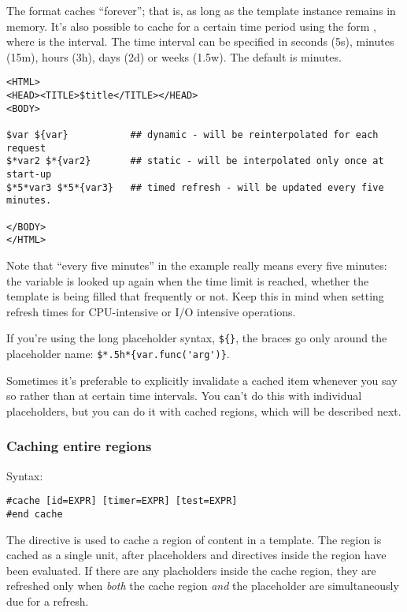 The \code{\$*} format caches ``forever''; that is, as long as the template
instance remains in memory.  It's also possible to cache for a certain time
period using the form , where  is
the interval.  The time interval can be specified in seconds (5s), minutes
(15m), hours (3h), days (2d) or weeks (1.5w). The default is minutes.

\begin{verbatim}
<HTML>
<HEAD><TITLE>$title</TITLE></HEAD>
<BODY>

$var ${var}           ## dynamic - will be reinterpolated for each request
$*var2 $*{var2}       ## static - will be interpolated only once at start-up
$*5*var3 $*5*{var3}   ## timed refresh - will be updated every five minutes.

</BODY>
</HTML>
\end{verbatim}

Note that ``every five minutes'' in the example really means every five
minutes: the variable is looked up again when the time limit is reached,
whether the template is being filled that frequently or not.  Keep this in
mind when setting refresh times for CPU-intensive or I/O intensive 
operations.

If you're using the long placeholder syntax, \verb+${}+, the braces go only
around the placeholder name: \verb+$*.5h*{var.func('arg')}+.

Sometimes it's preferable to explicitly invalidate a cached item whenever
you say so rather than at certain time intervals.  You can't do this with
individual placeholders, but you can do it with cached regions, which will
be described next.

\subsubsection{Caching entire regions}
\label{output.caching.regions}

Syntax:
\begin{verbatim}
#cache [id=EXPR] [timer=EXPR] [test=EXPR]
#end cache
\end{verbatim}

The  directive is used to cache a region of
content in a template.  The region is cached as a single unit, after 
placeholders and directives inside the region have been evaluated.  If there
are any  placholders inside the cache
region, they are refreshed only when {\em both} the cache region {\em and} the 
placeholder are simultaneously due for a refresh.

